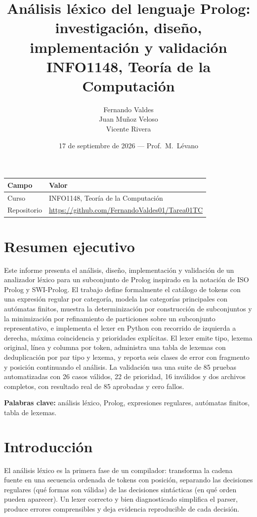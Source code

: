 \documentclass[11pt,a4paper]{article}
\title{Análisis léxico del lenguaje Prolog:\\investigación, diseño,
implementación y validación\\{\large INFO1148, Teoría de la Computación}}
\author{Fernando Valdes \\ Juan Muñoz Veloso \\ Vicente Rivera}
\date{17 de septiembre de 2026 --- Prof.\ M.\ Lévano}
\begin{document}
\maketitle

\begin{center}
  \begin{tabular}{ll}
    \toprule
    Campo & Valor \\
    \midrule
    Curso & INFO1148, Teoría de la Computación \\
    Repositorio & \url{https://github.com/FernandoValdes01/Tarea01TC} \\
    \bottomrule
  \end{tabular}
\end{center}

\section*{Resumen ejecutivo}
Este informe presenta el análisis, diseño, implementación y
validación de un analizador léxico para un subconjunto de Prolog
inspirado en la notación de ISO Prolog y SWI-Prolog. El trabajo
define formalmente el catálogo de tokens con una expresión regular
por categoría, modela las categorías principales con autómatas
finitos, muestra la determinización por construcción de subconjuntos
y la minimización por refinamiento de particiones sobre un
subconjunto representativo, e implementa el lexer en Python con
recorrido de izquierda a derecha, máxima coincidencia y prioridades
explícitas. El lexer emite tipo, lexema original, línea y columna por
token, administra una tabla de lexemas con deduplicación por par tipo
y lexema, y reporta seis clases de error con fragmento y posición
continuando el análisis. La validación usa una suite de 85 pruebas
automatizadas con 26 casos válidos, 22 de prioridad, 16 inválidos y
dos archivos completos, con resultado real de 85 aprobadas y cero fallos.

\textbf{Palabras clave:} análisis léxico, Prolog, expresiones
regulares, autómatas finitos, tabla de lexemas.

\section{Introducción}
El análisis léxico es la primera fase de un compilador: transforma la
cadena fuente en una secuencia ordenada de tokens con posición,
separando las decisiones regulares (qué formas son válidas) de las
decisiones sintácticas (en qué orden pueden aparecer). Un lexer
correcto y bien diagnosticado simplifica el parser, produce errores
comprensibles y deja evidencia reproducible de cada decisión.
\end{document}

